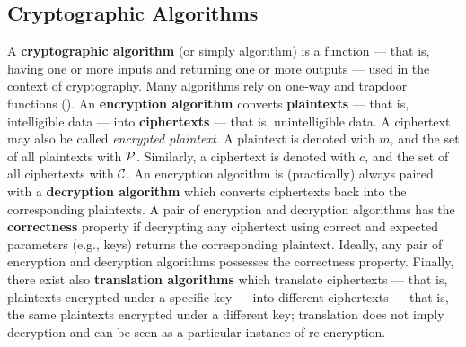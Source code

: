 \subsection{Cryptographic Algorithms}\label{sec:cryptography_basics:algorithms}

A \textbf{cryptographic algorithm} (or simply algorithm) is a function --- that is, having one or more inputs and returning one or more outputs --- used in the context of cryptography. Many algorithms rely on one-way and trapdoor functions (). An \textbf{encryption algorithm} converts \textbf{plaintexts} --- that is, intelligible data --- into \textbf{ciphertexts} --- that is, unintelligible data. A ciphertext may also be called \textit{encrypted plaintext}. A plaintext is denoted with $m$, and the set of all plaintexts with $\mathcal{P}$. Similarly, a ciphertext is denoted with $c$, and the set of all ciphertexts with $\mathcal{C}$. An encryption algorithm is (practically) always paired with a \textbf{decryption algorithm} which converts ciphertexts back into the corresponding plaintexts. A pair of encryption and decryption algorithms has the \textbf{correctness} property if decrypting any ciphertext using correct and expected parameters (e.g., keys) returns the corresponding plaintext. Ideally, any pair of encryption and decryption algorithms possesses the correctness property. Finally, there exist also \textbf{translation algorithms} which translate ciphertexts --- that is, plaintexts encrypted under a specific key --- into different ciphertexts --- that is, the same plaintexts encrypted under a different key; translation does not imply decryption and can be seen as a particular instance of re-encryption.
